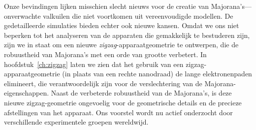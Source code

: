{
Onze bevindingen lijken misschien slecht nieuws voor de creatie van Majorana's---onverwachte valkuilen die niet voortkomen uit vereenvoudigde modellen.
De gedetailleerde simulaties bieden echter ook nieuwe kansen.
Omdat we ons niet beperken tot het analyseren van de apparaten die gemakkelijk te bestuderen zijn, zijn we in staat om een nieuwe \emph{zigzag}-apparaatgeometrie te ontwerpen, die de robuustheid van Majorana's met een orde van grootte verbetert.
In hoofdstuk~\ref{ch:zigzag} laten we zien dat het gebruik van een zigzag-apparaatgeometrie (in plaats van een rechte nanodraad) de lange elektronenpaden elimineert, die verantwoordelijk zijn voor de verslechtering van de Majorana-eigenschappen.
Naast de verbeterde robuustheid van de Majorana's, is deze nieuwe zigzag-geometrie ongevoelig voor de geometrische details en de precieze afstellingen van het apparaat.
Ons voorstel wordt nu actief onderzocht door verschillende experimentele groepen wereldwijd.
}